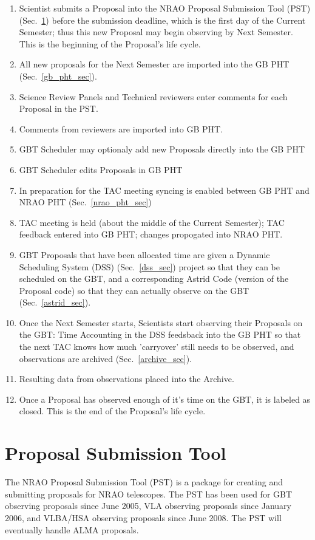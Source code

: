 \documentclass{article}
\begin{document}
\begin{enumerate}
\item Scientist submits a Proposal into the NRAO Proposal Submission Tool
(PST) (Sec.~\ref{pst_sec}) before the submission deadline, which is the first day of the Current
Semester; thus this new Proposal may begin observing by Next Semester.  This
is the beginning of the Proposal's life cycle.
\item All new proposals for the Next Semester are imported into the GB PHT (Sec.~\ref{gb_pht_sec}).
\item Science Review Panels and Technical reviewers enter comments for each
Proposal in the PST.
\item Comments from reviewers are imported into GB PHT.
\item GBT Scheduler may optionaly add new Proposals directly into the GB PHT
\item GBT Scheduler edits Proposals in GB PHT
\item In preparation for the TAC meeting syncing is enabled between GB PHT and NRAO PHT (Sec.~\ref{nrao_pht_sec})
\item TAC meeting is held (about the middle of the Current Semester); TAC
feedback entered into GB PHT; changes propogated into NRAO PHT.  
\item GBT Proposals that have been allocated time are given a Dynamic
Scheduling System (DSS) (Sec.~\ref{dss_sec}) project so that they can be scheduled on the GBT, and
a corresponding Astrid Code (version of the Proposal code) so that they can
actually observe on the GBT (Sec.~\ref{astrid_sec}).
\item Once the Next Semester starts, Scientists start observing their
Proposals on the GBT:
Time Accounting in the DSS feedsback into the GB PHT so that the next TAC
knows how much 'carryover' still needs to be observed, and observations are
archived (Sec.~\ref{archive_sec}).
\item Resulting data from observations placed into the Archive.
\item Once a Proposal has observed enough of it's time on the GBT, it is
labeled as closed.  This is the end of the Proposal's life cycle.
\end{enumerate}

\section{Proposal Submission Tool}\label{pst_sec}

The NRAO Proposal Submission Tool (PST) is a package for creating and submitting proposals for 
NRAO telescopes. The PST has been used for GBT observing proposals since June 2005, 
VLA observing proposals since January 2006, and VLBA/HSA observing proposals since June 2008. 
The PST will eventually handle ALMA proposals.
\end{document}

